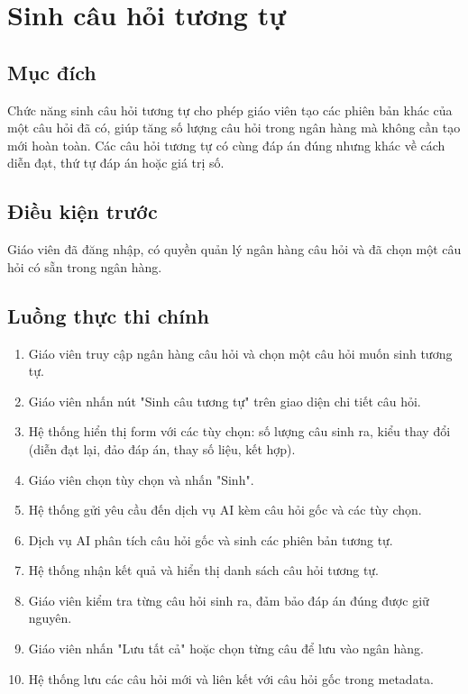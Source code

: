 ﻿\documentclass[../DoAn.tex]{subfiles}
\begin{document}
\section{Sinh câu hỏi tương tự}

\subsection{Mục đích}
Chức năng sinh câu hỏi tương tự cho phép giáo viên tạo các phiên bản khác của một câu hỏi đã có, giúp tăng số lượng câu hỏi trong ngân hàng mà không cần tạo mới hoàn toàn. Các câu hỏi tương tự có cùng đáp án đúng nhưng khác về cách diễn đạt, thứ tự đáp án hoặc giá trị số.

\subsection{Điều kiện trước}
Giáo viên đã đăng nhập, có quyền quản lý ngân hàng câu hỏi và đã chọn một câu hỏi có sẵn trong ngân hàng.

\subsection{Luồng thực thi chính}
\begin{enumerate}
    \item Giáo viên truy cập ngân hàng câu hỏi và chọn một câu hỏi muốn sinh tương tự.
    \item Giáo viên nhấn nút "Sinh câu tương tự" trên giao diện chi tiết câu hỏi.
    \item Hệ thống hiển thị form với các tùy chọn: số lượng câu sinh ra, kiểu thay đổi (diễn đạt lại, đảo đáp án, thay số liệu, kết hợp).
    \item Giáo viên chọn tùy chọn và nhấn "Sinh".
    \item Hệ thống gửi yêu cầu đến dịch vụ AI kèm câu hỏi gốc và các tùy chọn.
    \item Dịch vụ AI phân tích câu hỏi gốc và sinh các phiên bản tương tự.
    \item Hệ thống nhận kết quả và hiển thị danh sách câu hỏi tương tự.
    \item Giáo viên kiểm tra từng câu hỏi sinh ra, đảm bảo đáp án đúng được giữ nguyên.
    \item Giáo viên nhấn "Lưu tất cả" hoặc chọn từng câu để lưu vào ngân hàng.
    \item Hệ thống lưu các câu hỏi mới và liên kết với câu hỏi gốc trong metadata.
\end{enumerate}
\end{document}
